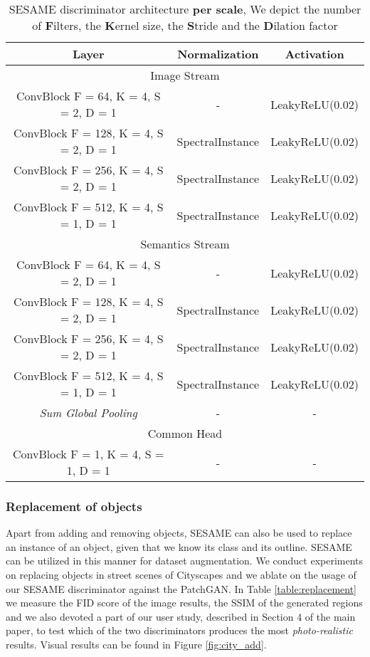 \documentclass[runningheads]{llncs}
\begin{document}
\begin{table}[]
    \centering
    \caption{SESAME discriminator architecture \textbf{per scale}, We depict the number of \textbf{F}ilters, the \textbf{K}ernel size, the \textbf{S}tride and the \textbf{D}ilation factor}
        \begin{tabular}{c|c|c}
    Layer & Normalization & Activation \\
    \hline
    \multicolumn{3}{c}{Image Stream} \\
    \hline
ConvBlock F = 64, K = 4, S = 2, D = 1 & - & LeakyReLU(0.02) \\
ConvBlock F = 128, K = 4, S = 2, D = 1 & SpectralInstance & LeakyReLU(0.02) \\
ConvBlock F = 256, K = 4, S = 2, D = 1 & SpectralInstance & LeakyReLU(0.02) \\
ConvBlock F = 512, K = 4, S = 1, D = 1 & SpectralInstance & LeakyReLU(0.02) \\
    \hline
    \multicolumn{3}{c}{Semantics Stream} \\
    \hline
ConvBlock F = 64, K = 4, S = 2, D = 1 & - & LeakyReLU(0.02) \\
ConvBlock F = 128, K = 4, S = 2, D = 1 & SpectralInstance & LeakyReLU(0.02) \\
ConvBlock F = 256, K = 4, S = 2, D = 1 & SpectralInstance & LeakyReLU(0.02) \\
ConvBlock F = 512, K = 4, S = 1, D = 1 & SpectralInstance & LeakyReLU(0.02) \\
\textit{Sum Global Pooling} & - & - \\
\hline
\multicolumn{3}{c}{Common Head} \\
\hline
ConvBlock F = 1, K = 4, S = 1, D = 1 & - & - \\
    \end{tabular}
    \label{tab:dis_arch}
\end{table}

\subsubsection{Replacement of objects}
Apart from adding and removing objects, SESAME can also be used to replace an instance of an object, given that we know its class and its outline.
SESAME can be utilized in this manner for dataset augmentation.
We conduct experiments on replacing objects in street scenes of Cityscapes and we ablate on the usage of our SESAME discriminator against the PatchGAN. In Table \ref{table:replacement} we measure the FID score of the image results, the SSIM of the generated regions and we also devoted a part of our user study, described in Section 4 of the main paper, to test which of the two discriminators produces the most \emph{photo-realistic} results. Visual results can be found in Figure \ref{fig:city_add}.
\end{document}
